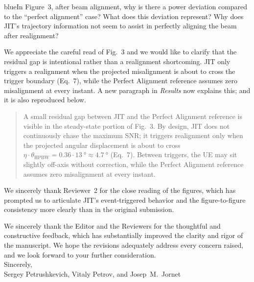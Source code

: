 \documentclass{article}
\newcommand{\blue}[1]{\begin{color}{blue}#1\end{color}}
\begin{document}
\begin{tcbremark}
{\selectfont
\blue{In Figure~3, after beam alignment, why is there a power deviation compared to the ``perfect alignment'' case? What does this deviation represent? Why does JIT's trajectory information not seem to assist in perfectly aligning the beam after realignment?}
}
\end{tcbremark}

\noindent We appreciate the careful read of Fig.~3 and we would like to clarify that the residual gap is intentional rather than a realignment shortcoming. JIT only triggers a realignment when the projected misalignment is about to cross the trigger boundary (Eq.~7), while the Perfect Alignment reference assumes zero misalignment at every instant. A new paragraph in \emph{Results} now explains this; and it is also reproduced below.

\begin{quote}
{\color{cyan!75!black}
A small residual gap between JIT and the Perfect Alignment reference is visible in the steady-state portion of Fig.~3. By design, JIT does not continuously chase the maximum SNR; it triggers realignment only when the projected angular displacement is about to cross $\eta \cdot \theta_{\text{HPBW}} = 0.36 \cdot \SI{13}{\degree} \approx \SI{4.7}{\degree}$ (Eq.~7). Between triggers, the UE may sit slightly off-axis without correction, while the Perfect Alignment reference assumes zero misalignment at every instant.
}
\end{quote}

\bigskip
\noindent We sincerely thank Reviewer~2 for the close reading of the figures, which has prompted us to articulate JIT's event-triggered behavior and the figure-to-figure consistency more clearly than in the original submission.

\newpage

\noindent We sincerely thank the Editor and the Reviewers for the thoughtful and constructive feedback, which has substantially improved the clarity and rigor of the manuscript. We hope the revisions adequately address every concern raised, and we look forward to your further consideration.\\

\noindent Sincerely,\\

\noindent Sergey Petrushkevich, Vitaly Petrov, and Josep~M.~Jornet

\printbibliography
\end{document}
